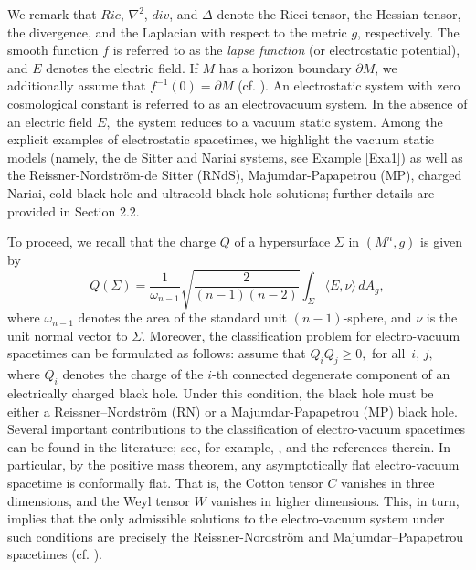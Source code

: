 \documentclass{amsart}
\numberwithin{equation}{section}
\begin{document}
We remark that \( Ric \), \( \nabla^2 \), \(div\), and \( \Delta \) denote the Ricci tensor, the Hessian tensor, the divergence, and the Laplacian with respect to the metric \( g \), respectively. The smooth function $f$ is referred to as the {\it lapse function} (or electrostatic potential), and $E$ denotes the electric field. If $M$ has a horizon boundary $\partial M$, we additionally assume that $f^{-1}(0)=\partial M$ (cf. \cite{cederbaum2016uniqueness, chrusciel2017non,tiarlos}). An electrostatic system with zero cosmological constant is referred to as an electro\-vacuum system. In the absence of an electric field $E,$ the system reduces to a vacuum static system. Among the explicit examples of electrostatic spacetimes, we highlight the vacuum static models (namely, the de Sitter and Nariai systems, see Example \ref{Exa1}) as well as the Reissner-Nordstr\"om-de Sitter (RNdS), Majumdar-Papapetrou (MP), charged Nariai, cold black hole and ultracold black hole solutions; further details are provided in Section 2.2. 


	
To proceed, we recall that the charge \( Q \) of a hypersurface \( \Sigma \) in \( (M^n, g) \) is given by
\begin{equation} \label{charge}
Q(\Sigma) = \frac{1}{\omega_{n-1}} \sqrt{\frac{2}{(n-1)(n-2)}} \int_{\Sigma} \langle E, \nu \rangle \, dA_g,
\end{equation}
where \( \omega_{n-1} \) denotes the area of the standard unit \((n-1)\)-sphere, and \( \nu \) is the unit normal vector to \( \Sigma \). Moreover, the classification problem for electro-vacuum spacetimes can be formulated as follows: assume that $Q_iQ_j \geq 0,$ for all $\,i,\,j,$ where $Q_i$
denotes the charge of the $i$-th connected degenerate component of an electrically charged black hole. Under this condition, the black hole must be either a Reissner–Nordstr\"om (RN) or a Majumdar-Papapetrou (MP) black hole. Several important contributions to the classification of electro-vacuum spacetimes can be found in the literature; see, for example, \cite{cederbaum2016uniqueness,chrusciel1999,chrusciel2007, kunduri2018, leandro2023, Lucietti}, and the references therein. In particular, by the positive mass theorem, any asymptotically flat electro-vacuum spacetime is conformally flat. That is, the Cotton tensor $C$ vanishes in three dimensions, and the Weyl tensor $W$ vanishes in higher dimensions. This, in turn, implies that the only admissible solutions to the electro-vacuum system under such conditions are precisely the Reissner-Nordstr\"om and Majumdar–Papapetrou spacetimes (cf. \cite[Theorem 3.6]{chrusciel1999}).
\end{document}
